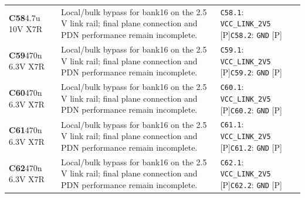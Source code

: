\documentclass[11pt,a4paper]{article}
\begin{document}
\begin{longtable}{@{}P{27mm}P{83mm}P{58mm}@{}}
\textbf{C58}\newline 4.7u 10V X7R & Local/bulk bypass for bank16 on the 2.5 V link rail; final plane connection and PDN performance remain incomplete. & \nolinkurl{C58.1}: \nolinkurl{VCC_LINK_2V5} [P]\newline \nolinkurl{C58.2}: \nolinkurl{GND} [P] \\
\textbf{C59}\newline 470n 6.3V X7R & Local/bulk bypass for bank16 on the 2.5 V link rail; final plane connection and PDN performance remain incomplete. & \nolinkurl{C59.1}: \nolinkurl{VCC_LINK_2V5} [P]\newline \nolinkurl{C59.2}: \nolinkurl{GND} [P] \\
\textbf{C60}\newline 470n 6.3V X7R & Local/bulk bypass for bank16 on the 2.5 V link rail; final plane connection and PDN performance remain incomplete. & \nolinkurl{C60.1}: \nolinkurl{VCC_LINK_2V5} [P]\newline \nolinkurl{C60.2}: \nolinkurl{GND} [P] \\
\textbf{C61}\newline 470n 6.3V X7R & Local/bulk bypass for bank16 on the 2.5 V link rail; final plane connection and PDN performance remain incomplete. & \nolinkurl{C61.1}: \nolinkurl{VCC_LINK_2V5} [P]\newline \nolinkurl{C61.2}: \nolinkurl{GND} [P] \\
\textbf{C62}\newline 470n 6.3V X7R & Local/bulk bypass for bank16 on the 2.5 V link rail; final plane connection and PDN performance remain incomplete. & \nolinkurl{C62.1}: \nolinkurl{VCC_LINK_2V5} [P]\newline \nolinkurl{C62.2}: \nolinkurl{GND} [P] \\

\end{longtable}
\end{document}
